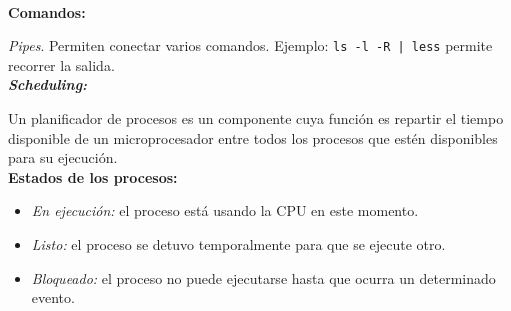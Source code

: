 \documentclass[a4paper,10pt,spanish]{article}
\begin{document}
\dotfill \\

\textbf{Comandos:}

\textit{Pipes}. Permiten conectar varios comandos. Ejemplo: \texttt{ls -l -R | less} permite recorrer la salida. \\

\textit{\textbf{Scheduling:}}

Un planificador de procesos es un componente cuya función es repartir el tiempo disponible de un microprocesador entre todos los procesos que estén disponibles para su ejecución. \\

\textbf{Estados de los procesos:}

\begin{itemize}
\item \textit{En ejecución:} el proceso está usando la CPU en este momento.
\item \textit{Listo:} el proceso se detuvo temporalmente para que se ejecute otro.
\item \textit{Bloqueado:} el proceso no puede ejecutarse hasta que ocurra un determinado evento.
\end{itemize}
\end{document}
